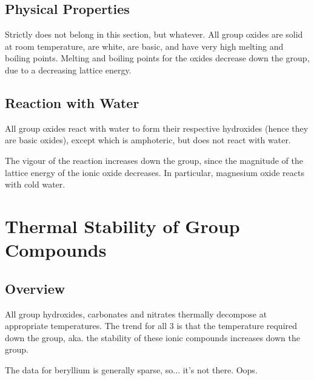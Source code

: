 		\subsection{Physical Properties}

			Strictly does not belong in this section, but whatever. All group \rtwo{} oxides are solid at room
			temperature, are white, are basic, and have very high melting and boiling points. Melting and
			boiling points for the oxides decrease down the group, due to a decreasing lattice energy.



		\subsection{Reaction with Water}

			All group \rtwo{} oxides react with water to form their respective hydroxides (hence they are basic
			oxides), except  which is amphoteric, but does not react with water.

			The vigour of the reaction increases down the group, since the magnitude of the lattice energy
			of the ionic oxide decreases. In particular, magnesium oxide reacts  with cold water.





	\section{Thermal Stability of Group  Compounds}

		\subsection{Overview}

			All group \rtwo{} hydroxides, carbonates and nitrates thermally decompose at appropriate
			temperatures. The trend for all 3 is that the temperature required  down
			the group, aka. the stability of these ionic compounds increases down the group.

			The data for beryllium is generally sparse, so... it's not there. Oops.

